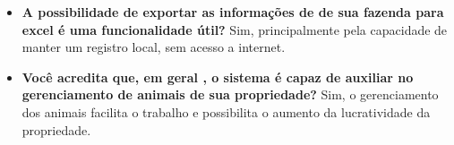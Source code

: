 \begin{apendicesenv}
\begin{itemize}
	\item \textbf{A possibilidade de exportar as informações de de sua fazenda para excel é uma funcionalidade útil?}
	\newline
	Sim, principalmente pela capacidade de manter um registro local, sem acesso a internet.

	\item \textbf{Você acredita que, em geral , o sistema é capaz de auxiliar no gerenciamento de animais de sua propriedade?}
	\newline
	Sim, o gerenciamento dos animais facilita o trabalho e possibilita o aumento da lucratividade da propriedade.

\end{itemize}


\end{apendicesenv}

